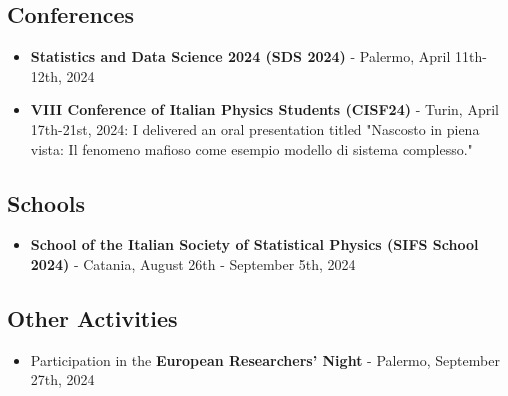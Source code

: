 \documentclass[a4paper, 10pt]{scrartcl}
\begin{document}
\subsection*{Conferences}
\begin{itemize}
  \item \textbf{Statistics and Data Science 2024 (SDS 2024)} - Palermo, April 11th-12th, 2024
  \item \textbf{VIII Conference of Italian Physics Students (CISF24)} - Turin, April 17th-21st, 2024: I delivered an oral presentation titled "Nascosto in piena vista: Il fenomeno mafioso come esempio modello di sistema complesso."
\end{itemize}

\subsection*{Schools}
\begin{itemize}
  \item \textbf{School of the Italian Society of Statistical Physics (SIFS School 2024)} - Catania, August 26th - September 5th, 2024
\end{itemize}

\subsection*{Other Activities}
\begin{itemize}
  \item Participation in the \textbf{European Researchers' Night} - Palermo, September 27th, 2024
\end{itemize}

%
\printbibliography
\end{document}
